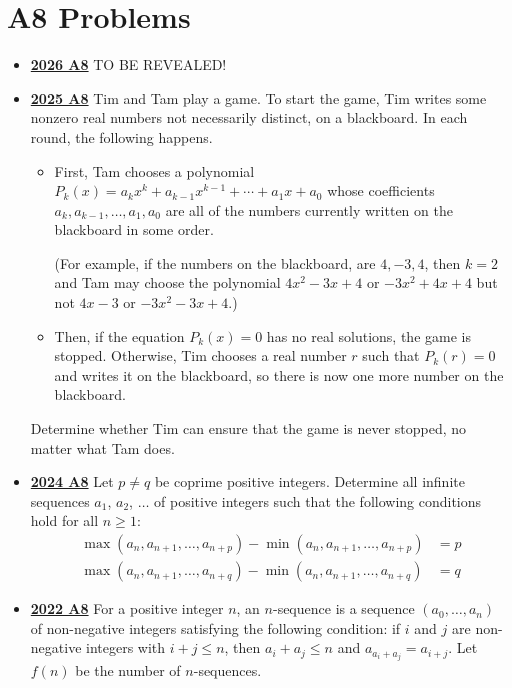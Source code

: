 \documentclass[11pt]{scrartcl}
\begin{document}
\section*{A8 Problems}  \label{A8}
 \begin{itemize}[leftmargin=*]

 \item \href{https://www.imo-official.org/assets/documents/problems/2026/IMO2026SL.pdf}{\textbf{2026 A8}} TO BE REVEALED!
 
 \item \href{https://artofproblemsolving.com/community/c6h3866871p38676988}{\textbf{2025 A8}} Tim and Tam play a game. To start the game, Tim writes some nonzero real numbers not necessarily distinct, on a blackboard. In each round, the following happens.
\begin{itemize}[leftmargin=*]
    \item[$\bullet$]
First, Tam chooses a polynomial $P_k(x)=a_kx^k+a_{k-1}x^{k-1}+\cdots+a_1x+a_0$ whose coefficients $a_k,a_{k-1},\dots,a_1,a_0$ are all of the numbers currently written on the blackboard in some order. 

(For example, if the numbers on the blackboard, are $4,-3,4$, then $k=2$ and Tam may choose the polynomial $4x^2-3x+4$ or $-3x^2+4x+4$ but not $4x-3$ or $-3x^2-3x+4$.)
\item[$\bullet$] Then, if the equation $P_k(x)=0$ has no real solutions, the game is stopped. Otherwise, Tim chooses a real number $r$ such that $P_k(r)=0$ and writes it on the blackboard, so there is now one more number on the blackboard.

\end{itemize}
Determine whether Tim can ensure that the game is never stopped, no matter what Tam does.
\item \href{https://artofproblemsolving.com/community/c6h3610460p35340944}{\textbf{2024 A8}} Let $p \ne q$ be coprime positive integers. Determine all infinite sequences $a_1$, $a_2$, $\dots$ of positive integers such that the following conditions hold for all $n \geqslant 1$:
\begin{align*}
    \max(a_n, a_{n+1}, \dots, a_{n+p}) - \min(a_n, a_{n+1}, \dots, a_{n+p}) &= p \\
    \max(a_n, a_{n+1}, \dots, a_{n+q}) - \min(a_n, a_{n+1}, \dots, a_{n+q}) &= q   
\end{align*}
    \item \href{https://artofproblemsolving.com/community/c6h3107360p28104441}{\textbf{2022 A8}} For a positive integer $n$, an $n$-sequence is a sequence $(a_0,\dots,a_n)$ of non-negative integers satisfying the following condition: if $i$ and $j$ are non-negative integers with $i+j \leqslant n$, then $a_i+a_j \leqslant n$ and $a_{a_i+a_j}=a_{i+j}$. Let $f(n)$ be the number of $n$-sequences. 
    

\end{itemize}
\end{document}
